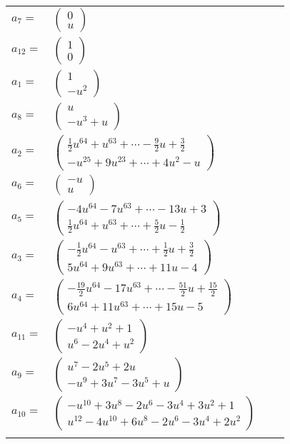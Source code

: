 \documentclass[1p]{elsarticle_modified}
\theoremstyle{definition}
\begin{document}
\begin{tabular}{m{7pt} m{180pt} m{7pt} m{180pt} }
\flushright $a_{7}=$&$\begin{pmatrix}0\\u\end{pmatrix}$ \\
\flushright $a_{12}=$&$\begin{pmatrix}1\\0\end{pmatrix}$ \\
\flushright $a_{1}=$&$\begin{pmatrix}1\\- u^2\end{pmatrix}$ \\
\flushright $a_{8}=$&$\begin{pmatrix}u\\- u^3+u\end{pmatrix}$ \\
\flushright $a_{2}=$&$\begin{pmatrix}\frac{1}{2} u^{64}+u^{63}+\cdots-\frac{9}{2} u+\frac{3}{2}\\- u^{25}+9 u^{23}+\cdots+4 u^2- u\end{pmatrix}$ \\
\flushright $a_{6}=$&$\begin{pmatrix}- u\\u\end{pmatrix}$ \\
\flushright $a_{5}=$&$\begin{pmatrix}-4 u^{64}-7 u^{63}+\cdots-13 u+3\\\frac{1}{2} u^{64}+u^{63}+\cdots+\frac{5}{2} u-\frac{1}{2}\end{pmatrix}$ \\
\flushright $a_{3}=$&$\begin{pmatrix}-\frac{1}{2} u^{64}- u^{63}+\cdots+\frac{1}{2} u+\frac{3}{2}\\5 u^{64}+9 u^{63}+\cdots+11 u-4\end{pmatrix}$ \\
\flushright $a_{4}=$&$\begin{pmatrix}-\frac{19}{2} u^{64}-17 u^{63}+\cdots-\frac{51}{2} u+\frac{15}{2}\\6 u^{64}+11 u^{63}+\cdots+15 u-5\end{pmatrix}$ \\
\flushright $a_{11}=$&$\begin{pmatrix}- u^4+u^2+1\\u^6-2 u^4+u^2\end{pmatrix}$ \\
\flushright $a_{9}=$&$\begin{pmatrix}u^7-2 u^5+2 u\\- u^9+3 u^7-3 u^5+u\end{pmatrix}$ \\
\flushright $a_{10}=$&$\begin{pmatrix}- u^{10}+3 u^8-2 u^6-3 u^4+3 u^2+1\\u^{12}-4 u^{10}+6 u^8-2 u^6-3 u^4+2 u^2\end{pmatrix}$\\&\end{tabular}
\end{document}
